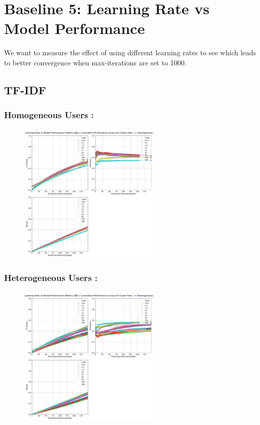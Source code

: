 \documentclass[a4paper,fontsize=8.0pt]{scrartcl}
\begin{document}
\newpage
\section{Baseline 5: Learning Rate vs Model Performance}
\begin{flushleft}
We want to measure the effect of using different learning rates to see which leads to better convergence when max-iterations are set to 1000.
\end{flushleft}
\subsection{TF-IDF}
\subsubsection{Homogeneous Users :}
\begin{figure}[H]
 \includegraphics[width=0.6\textwidth]{Graphs/TFIDF/lr_vs_model_performance_cumu_Homogeneous.pdf}
\end{figure}
\subsubsection{Heterogeneous Users :}
\begin{figure}[H]
 \includegraphics[width=0.6\textwidth]{Graphs/TFIDF/lr_vs_model_performance_cumu_Heterogeneous.pdf}
\end{figure}
\end{document}
